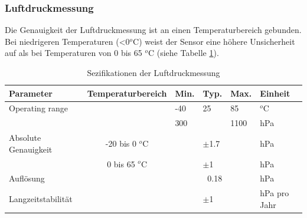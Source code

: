\newpage

\subsubsection*{Luftdruckmessung}
Die Genauigkeit der Luftdruckmessung ist an einen Temperaturbereich gebunden. Bei niedrigeren Temperaturen (<0$^{o}$C) weist der Sensor eine höhere Unsicherheit auf als bei Temperaturen von 0 bis 65 $^{o}$C (siehe Tabelle \ref{tab:spez_druck}). \\
\begin{table}[htbp]
  \centering
  \caption{Sezifikationen der Luftdruckmessung \cite{Bosch2019}}
    \begin{tabular}{llllll}
    \toprule
    \textbf{Parameter} & \multicolumn{1}{l}{\textbf{Temperaturbereich}} & \multicolumn{1}{l}{\textbf{Min.}} & \textbf{Typ. } & \multicolumn{1}{l}{\textbf{Max.}} & \textbf{Einheit} \\
    \midrule
    Operating range &       & \multicolumn{1}{l}{-40} & 25    & \multicolumn{1}{l}{85} & $^{o}$C \\
          &       & 300   &       & 1100  & hPa \\
    Absolute Genauigkeit & \multicolumn{1}{c}{-20 bis 0 $^{o}$C} &       & $\pm$1.7 &       & hPa \\
          & \multicolumn{1}{c}{0 bis 65 $^{o}$C} &       & $\pm$1  &       & hPa \\
    Auflösung &       &       & \multicolumn{1}{r}{0.18} &       & hPa \\
    Langzeitstabilität &       &       & $\pm$1  &       & hPa pro Jahr \\
    \bottomrule
    \end{tabular}%
  \label{tab:spez_druck}%
\end{table}%

